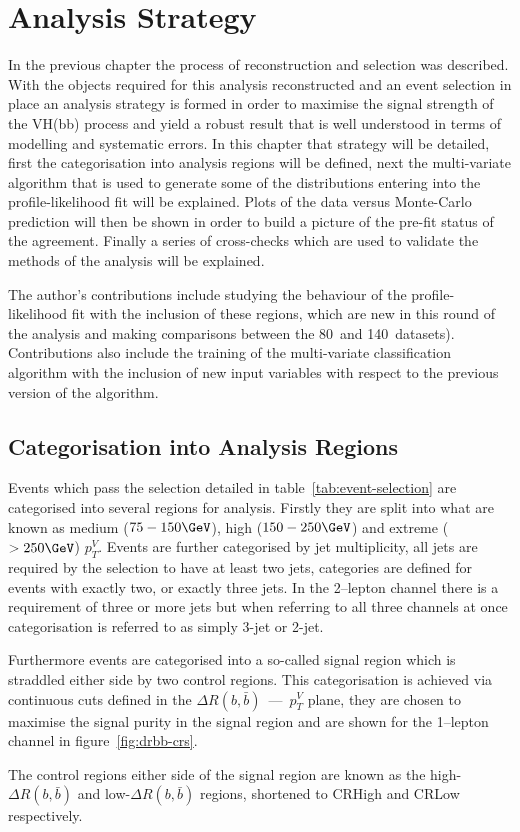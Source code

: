 \chapter{Analysis Strategy}%
\label{ch:strategy}
In the previous chapter the process of reconstruction and selection was
described. With the objects required for this analysis reconstructed and an
event selection in place an analysis strategy is formed in order to maximise the
signal strength of the VH(bb) process and yield a robust result that is well
understood in terms of modelling and systematic errors. In this chapter that
strategy will be detailed, first the categorisation into analysis regions will
be defined, next the multi-variate algorithm that is used to generate some of
the distributions entering into the profile-likelihood fit will be explained.
Plots of the data versus Monte-Carlo prediction will then be shown in order to
build a picture of the pre-fit status of the agreement. Finally a series of
cross-checks which are used to validate the methods of the analysis will be
explained.

The author's contributions include studying the behaviour of the
profile-likelihood fit with the inclusion of these regions, which are new in
this round of the analysis and making comparisons between the 80~\invfb and
140~\invfb datasets). Contributions also include the training of the
multi-variate classification algorithm with the inclusion of new input variables
with respect to the previous version of the algorithm.

\section{Categorisation into Analysis Regions}
\label{sec:ana-regions}

Events which pass the selection detailed in table~\ref{tab:event-selection} are
categorised into several regions for analysis. Firstly they are split into what
are known as medium ($75 - 150 \GeV$), high ($150 - 250 \GeV$) and extreme ($ >
250 \GeV$) $p_T^{V}$. Events are further categorised by jet multiplicity, all
jets are required by the selection to have at least two jets, categories are
defined for events with exactly two, or exactly three jets. In the 2--lepton
channel there is a requirement of three or more jets but when referring to all
three channels at once categorisation is referred to as simply 3-jet or 2-jet.

Furthermore events are categorised into a so-called signal region which is
straddled either side by two control regions. This categorisation is achieved
via continuous cuts defined in the $\Delta R(b, \bar{b})$~---~$p_T^{V}$ plane,
they are chosen to maximise the signal purity in the signal region and are shown
for the 1--lepton channel in figure~\ref{fig:drbb-crs}.

The control regions either side of the signal region are known as the
high-$\Delta R(b, \bar{b})$ and low-$\Delta R(b, \bar{b})$ regions, shortened to
CRHigh and CRLow respectively.

